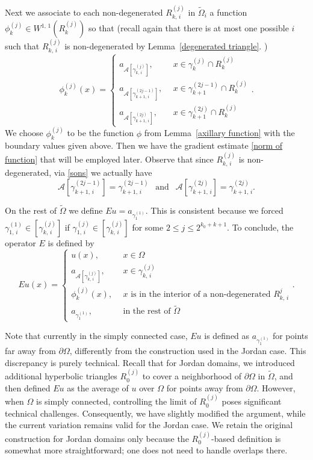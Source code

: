 \documentclass[reqno,11pt]{amsart}
\def\wz{\widetilde}
\numberwithin{equation}{section}
\theoremstyle{remark}
\begin{document}
Next we  associate to each non-degenerated 
$R_{k,\,i}^{(j)}$ in $\wz \Omega_i$
a function $\phi_{k}^{(j)}\in W^{1,\,1}(R_{k}^{(j)})$ so that (recall again  that there is at most one possible $i$ such that $R_{k,\,i}^{(j)}$ is non-degenerated by Lemma~\ref{degenerated triangle}. )
\[
\phi_{k}^{(j)}(x) = \begin{cases}
a_{\mathcal A[\gamma_{k,\,i}^{(j)}]}, \ & \ x\in \gamma_k^{(j)}\cap R_{k}^{(j)}\\
a_{\mathcal A[\gamma_{k+1,\,i}^{(2j-1)}]}, \ & \ x\in \gamma_{k+1}^{(2j-1)}\cap R_{k}^{(j)}\\
a_{\mathcal A[\gamma_{k+1,\,i}^{(2j)}]}, \ & \ x\in \gamma_{k+1}^{(2j)}\cap R_{k}^{(j)}
                    \end{cases}.
\]
We choose $\phi_k^{(j)}$ to be the function $\phi$ from Lemma~\ref{axillary function}  with the  boundary values given above. Then we  have the gradient estimate \eqref{norm of function} that will be employed later. 
Observe that since $R_{k,\,i}^{(j)}$  is non-degenerated, via \eqref{sons} we actually have 
$$\mathcal A[\gamma_{k+1,\,i}^{(2j-1)}]= \gamma_{k+1,\,i}^{(2j-1)} \ \ \text{ and } \ \ \mathcal A[\gamma_{k+1,\,i}^{(2j)}]= \gamma_{k+1,\,i}^{(2j)}.$$ 


On the rest of $\wz \Omega$ we define $Eu=a_{\gamma_{1}^{(1)}}$. This is consistent because we forced $\gamma_{1,\,i}^{(1)}\in [\gamma_{k,\,i}^{(j)}]$ if $\gamma_{1,\,i}^{(j)}\in [\gamma_{k,\,i}^{(j)}]$ for some $2\le j\le 2^{k_0+k+1}.$ 
To conclude, the operator $E$ is defined by 
\[
Eu(x) = \begin{cases}
u(x), \ & \ x\in \Omega\\
a_{\mathcal A[\gamma_{k,\,i}^{(j)}]}, \ & \ x \in \gamma_{k,\,i}^{(j)}\\
\phi_{k}^{(j)}(x), \ & \ x \text{ is in the interior of a non-degenerated } R_{k,\,i}^{j} \\
a_{\gamma_{1}^{(1)}}, \ & \ \text{in the rest of $\wz \Omega$}
                    \end{cases}.
\]


Note that currently in the simply connected case,  $Eu$ is defined as $a_{\gamma_{1}^{(1)}}$ for points far away from $\partial\Omega$, differently from the construction used in the Jordan case. This discrepancy is purely technical. Recall that for Jordan domains, we introduced additional hyperbolic triangles $R_{0}^{(j)}$ to cover a neighborhood of $\partial \Omega$ in $\wz \Omega$, and then defined $Eu$ as the average of $u$ over $\Omega$  for points away from $\partial\Omega$. However, when $\Omega$ is simply connected, controlling the limit of $R_{0}^{(j)}$  poses significant technical challenges. Consequently, we have slightly modified the argument, while the current variation remains valid for the Jordan case. We retain the original construction for Jordan domains only because the $R_{0}^{(j)}$-based definition is somewhat more straightforward; one does not need to handle overlaps there.
 
\end{document}
